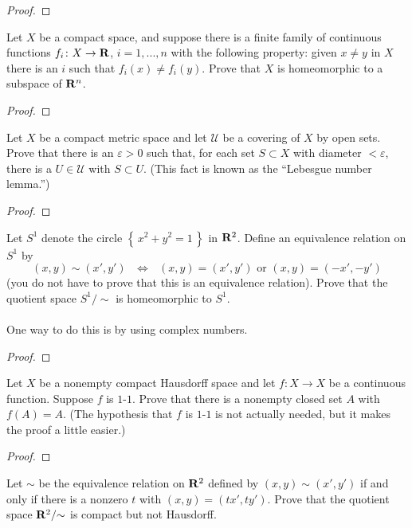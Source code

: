 \begin{proof}
\end{proof}
\begin{problem}
Let $X$ be a compact space, and suppose there is a finite family
of continuous functions $f_i\colon X\to\mathbf{R}$, $i=1,...,n$ with the
following property: given $x\neq y$ in $X$ there is an $i$ such
that $f_i(x)\neq f_i(y)$. Prove that $X$ is homeomorphic to a
subspace of $\mathbf{R}^n$.
\end{problem}
\begin{proof}
\end{proof}
\begin{problem}
Let $X$ be a compact metric space and let $\mathcal{U}$ be a
covering of $X$ by open sets. Prove that there is an
$\varepsilon>0$ such that, for each set $S\subset X$ with
diameter $<\varepsilon$, there is a $U\in\mathcal{U}$ with
$S\subset U$. (This fact is known as the ``Lebesgue number lemma.'')
\end{problem}
\begin{proof}
\end{proof}
\begin{problem}
Let $S^1$ denote the circle $\left\{\,x^2+y^2=1\,\right\}$ in
$\mathbf{R}^2$. Define an equivalence relation on $S^1$ by
\[\text{$(x,y)\sim (x',y')$ $\iff$ $(x,y)=(x',y')$ or $(x,y)=(-x',-y')$}\]
(you do not have to prove that this is an equivalence
relation). Prove that the quotient space $S^1/{\sim}$ is
homeomorphic to $S^1$.
\\\\
One way to do this is by using complex numbers.
\end{problem}
\begin{proof}
\end{proof}
\begin{problem}
Let $X$ be a nonempty compact Hausdorff space and let $f\colon
X\to X$ be a continuous function. Suppose $f$ is $1$-$1$. Prove
that there is a nonempty closed set $A$ with $f(A)=A$. (The
hypothesis that $f$ is $1$-$1$ is not actually needed, but it
makes the proof a little easier.)
\end{problem}
\begin{proof}
\end{proof}
\begin{problem}
Let $\sim$ be the equivalence relation on $\mathbf{R}^2$ defined by
$(x,y)\sim(x',y')$ if and only if there is a nonzero $t$ with
$(x,y)=(tx',ty')$. Prove that the quotient space $\mathbf{R}^2/{\sim}$
is compact but not Hausdorff.
\end{problem}
